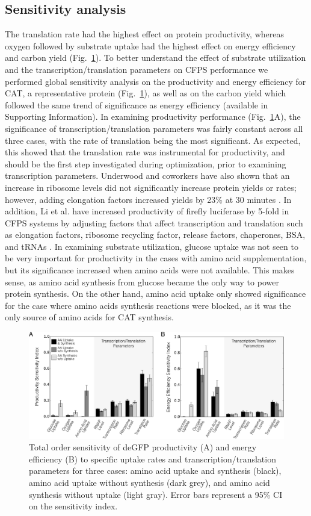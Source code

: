 \documentclass[journal=asbcd6,manuscript=article]{achemso}
\begin{document}
\subsection{Sensitivity analysis}
The translation rate had the highest effect on protein productivity, whereas oxygen followed by substrate uptake had the highest effect on energy efficiency and carbon yield (Fig.~\ref{fig:SI}).
To better understand the effect of substrate utilization and the transcription/translation parameters on CFPS performance we performed global sensitivity analysis on the productivity and energy efficiency for CAT, a representative protein (Fig.~\ref{fig:SI}), as well as on the carbon yield which followed the same trend of significance as energy efficiency (available in Supporting Information).
In examining productivity performance (Fig.~\ref{fig:SI}A), the significance of transcription/translation parameters was fairly constant across all three cases, with the rate of translation being the most significant.
As expected, this showed that the translation rate was instrumental for productivity, and should be the first step investigated during optimization, prior to examining transcription parameters.
Underwood and coworkers have also shown that an increase in ribosome levels did not significantly increase protein yields or rates; however, adding elongation factors increased yields by 23\% at 30 minutes \cite{2005_underwood_biotech}.
In addition, Li et al. have increased productivity of firefly luciferase by 5-fold in CFPS systems by adjusting factors that affect transcription and translation such as elongation factors, ribosome recycling factor, release factors, chaperones, BSA, and tRNAs \cite{2014_li_PlosOne}.
In examining substrate utilization, glucose uptake was not seen to be very important for productivity in the cases with amino acid supplementation, but its significance increased when amino acids were not available.
This makes sense, as amino acid synthesis from glucose became the only way to power protein synthesis.
On the other hand, amino acid uptake only showed significance for the case where amino acids synthesis reactions were blocked, as it was the only source of amino acids for CAT synthesis.
\begin{figure}[t!]
\includegraphics[width=1.00\textwidth]{./Figures/Sensitivity.pdf}
\caption{Total order sensitivity of deGFP productivity (A) and energy efficiency (B) to specific uptake rates and transcription/translation parameters for three cases: amino acid uptake and synthesis (black), amino acid uptake without synthesis (dark grey), and amino acid synthesis without uptake (light gray). Error bars represent a 95\% CI on the sensitivity index.}
\label{fig:SI}
\end{figure}
\end{document}
